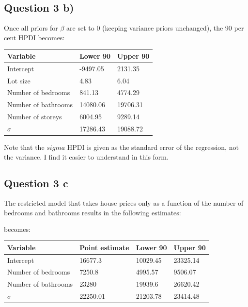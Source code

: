 \documentclass[a4paper,11pt]{article}
\begin{document}
\subsection*{Question 3 b)}

Once all priors for $\beta$ are set to 0 (keeping variance priors unchanged), the 90 per cent HPDI becomes:\bigskip


\begin{centering}
  \begin{tabular}{|l|l|l|}
  \hline
  Variable & Lower 90 & Upper 90\\
  \hline
  Intercept & -9497.05 & 2131.35 \\
  Lot size & 4.83 & 6.04 \\
  Number of bedrooms & 841.13 & 4774.29 \\
  Number of bathrooms & 14080.06 & 19706.31 \\
  Number of storeys & 6004.95 & 9289.14 \\
  $\sigma$ & 17286.43 & 19088.72 \\
  \hline
\end{tabular}

\end{centering}

\bigskip
Note that the $sigma$ HPDI is given as the standard error of the regression, not the variance. I find it easier to understand in this form.

\subsection*{Question 3 c}

The restricted model that takes house prices only as a function of the number of bedrooms and bathrooms results in the following estimates:

becomes:\bigskip


\begin{centering}
  \begin{tabular}{|l|l|l|l|}
  \hline
  Variable & Point estimate & Lower 90 & Upper 90 \\
  \hline
  Intercept & 16677.3 & 10029.45 & 23325.14 \\
  Number of bedrooms & 7250.8 & 4995.57 & 9506.07 \\
  Number of bathrooms & 23280 & 19939.6 & 26620.42 \\
  $\sigma$ & 22250.01 & 21203.78 & 23414.48 \\
  \hline
\end{tabular}

\end{centering}
\end{document}
